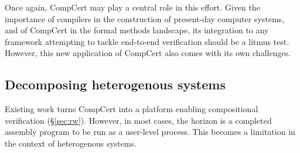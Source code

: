 \documentclass[acmsmall,screen,review,anonymous]{acmart}
\begin{document}

Once again,
CompCert may play a central role in this effort.
Given the importance of compilers in
the construction of present-day computer systems,
and of CompCert in the formal methods landscape,
its integration to any framework
attempting to tackle end-to-end verification
should be a litmus test.
However, this new application of CompCert also
comes with its own challenges.


\subsection{Decomposing heterogenous systems} %

Existing work turns CompCert
into a platform enabling compositional verification (\S\ref{sec:rw}).
However, in most cases,
the horizon is a completed assembly program to be run as a user-level process.
This becomes a limitation in the context of heterogenous systems.
\end{document}
